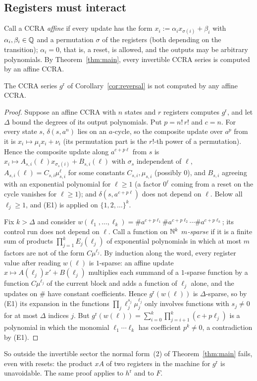 \subsection{Registers must interact}
Call a CCRA \emph{affine} if every update has the form $x_i:=\alpha_ix_{\sigma(i)}+\beta_i$ with $\alpha_i,\beta_i\in\mathbb{Q}$ and a permutation $\sigma$ of the registers (both depending on the transition); $\alpha_i=0$, that is, a reset, is allowed, and the outputs may be arbitrary polynomials. By Theorem~\ref{thm:main}, every invertible CCRA series is computed by an affine CCRA.

\begin{proposition}\label{prop:interact}
The CCRA series $g^{\mathrm r}$ of Corollary~\ref{cor:reversal} is not computed by any affine CCRA.
\end{proposition}
\begin{proof}
Suppose an affine CCRA with $n$ states and $r$ registers computes $g^{\mathrm r}$, and let $\Delta$ bound the degrees of its output polynomials. Put $p=n!\,r!$ and $c=n$. For every state $s$, $\delta(s,a^n)$ lies on an $a$-cycle, so the composite update over $a^p$ from it is $x_i\mapsto\mu_ix_i+\nu_i$ (its permutation part is the $r!$-th power of a permutation). Hence the composite update along $a^{c+p\ell}$ from $s$ is $x_i\mapsto A_{s,i}(\ell)x_{\sigma_s(i)}+B_{s,i}(\ell)$ with $\sigma_s$ independent of $\ell$, $A_{s,i}(\ell)=C_{s,i}\mu_{s,i}^\ell$ for some constants $C_{s,i},\mu_{s,i}$ (possibly $0$), and $B_{s,i}$ agreeing with an exponential polynomial for $\ell\ge1$ (a factor $0^\ell$ coming from a reset on the cycle vanishes for $\ell\ge1$); and $\delta(s,a^{c+p\ell})$ does not depend on $\ell$. Below all $\ell_j\ge1$, and (E1) is applied on $\{1,2,\ldots\}^k$.

Fix $k>\Delta$ and consider $w(\ell_1,\ldots,\ell_k)=\#a^{c+p\ell_1}\#a^{c+p\ell_2}\cdots\#a^{c+p\ell_k}$; its control run does not depend on $\ell$. Call a function on $\mathbb{N}^k$ \emph{$m$-sparse} if it is a finite sum of products $\prod_{j=1}^kE_j(\ell_j)$ of exponential polynomials in which at most $m$ factors are not of the form $C\mu^{\ell_j}$. By induction along the word, every register value after reading $w(\ell)$ is $1$-sparse: an affine update $x\mapsto A(\ell_j)x'+B(\ell_j)$ multiplies each summand of a $1$-sparse function by a function $C\mu^{\ell_j}$ of the current block and adds a function of $\ell_j$ alone, and the updates on $\#$ have constant coefficients. Hence $g^{\mathrm r}(w(\ell))$ is $\Delta$-sparse, so by (E1) its expansion in the functions $\prod_j\ell_j^{s_j}\mu_j^{\ell_j}$ only involves functions with $s_j\ne0$ for at most $\Delta$ indices $j$. But $g^{\mathrm r}(w(\ell))=\sum_{i=0}^k\prod_{j=i+1}^k(c+p\ell_j)$ is a polynomial in which the monomial $\ell_1\cdots\ell_k$ has coefficient $p^k\ne0$, a contradiction by (E1).
\end{proof}
So outside the invertible sector the normal form~(2) of Theorem~\ref{thm:main} fails, even with resets: the product $xA$ of two registers in the machine for $g^{\mathrm r}$ is unavoidable. The same proof applies to $h^{\mathrm r}$ and to $F$.

